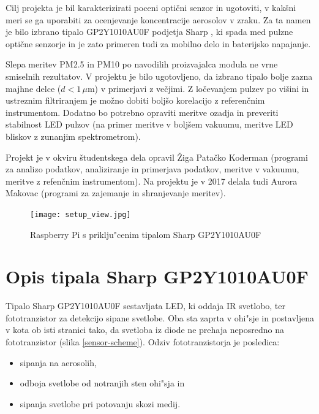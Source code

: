 \documentclass[12pt,a4paper]{article}
\begin{document}
Cilj projekta je bil karakterizirati poceni optični senzor in ugotoviti, v kakšni meri se ga uporabiti za ocenjevanje koncentracije aerosolov v zraku. Za ta namen je bilo izbrano tipalo GP2Y1010AU0F podjetja Sharp \cite{sharp-gp2y1010au0f},
ki spada med pulzne optične senzorje in je zato primeren tudi za mobilno delo in baterijsko napajanje. 


 Slepa meritev PM2.5 in PM10 po navodilih proizvajalca modula ne vrne smiselnih rezultatov.
V projektu je bilo ugotovljeno, da izbrano tipalo bolje zazna majhne delce ($d < 1\,\mu$m) v primerjavi z večjimi. Z ločevanjem pulzev po višini in ustreznim filtriranjem je možno dobiti boljšo korelacijo z referenčnim instrumentom. Dodatno bo potrebno opraviti meritve ozadja in preveriti stabilnost LED pulzov (na primer meritve v boljšem vakuumu, meritve LED bliskov z zunanjim spektrometrom). 

\bigskip
Projekt je v okviru študentskega dela opravil Žiga Patačko Koderman (programi za analizo podatkov, analiziranje in primerjava podatkov, meritve v vakuumu, meritve z refenčnim instrumentom). 
Na projektu je v 2017 delala tudi Aurora Makovac (programi za zajemanje in shranjevanje meritev).

\begin{figure}[bh!]
	\begin{center}
		\texttt{[image: setup\_view.jpg]}
		\caption{Raspberry Pi s priklju"cenim tipalom Sharp GP2Y1010AU0F}
		\label{setup-view}
	\end{center}
\end{figure}

\newpage
\section{Opis tipala Sharp GP2Y1010AU0F}

Tipalo Sharp GP2Y1010AU0F \cite{sharp-gp2y1010au0f} sestavljata LED, ki oddaja IR svetlobo, ter fototranzistor za detekcijo sipane svetlobe. Oba sta zaprta v ohi"sje in postavljena v kota ob isti stranici tako, da svetloba iz diode ne prehaja neposredno na fototranzistor (slika \ref{sensor-scheme}). Odziv fototranzistorja je posledica:
\begin{itemize}
	\item sipanja na aerosolih,
	\item odboja svetlobe od notranjih sten ohi"sja in
	\item sipanja svetlobe pri potovanju skozi medij.
\end{itemize}
\end{document}
